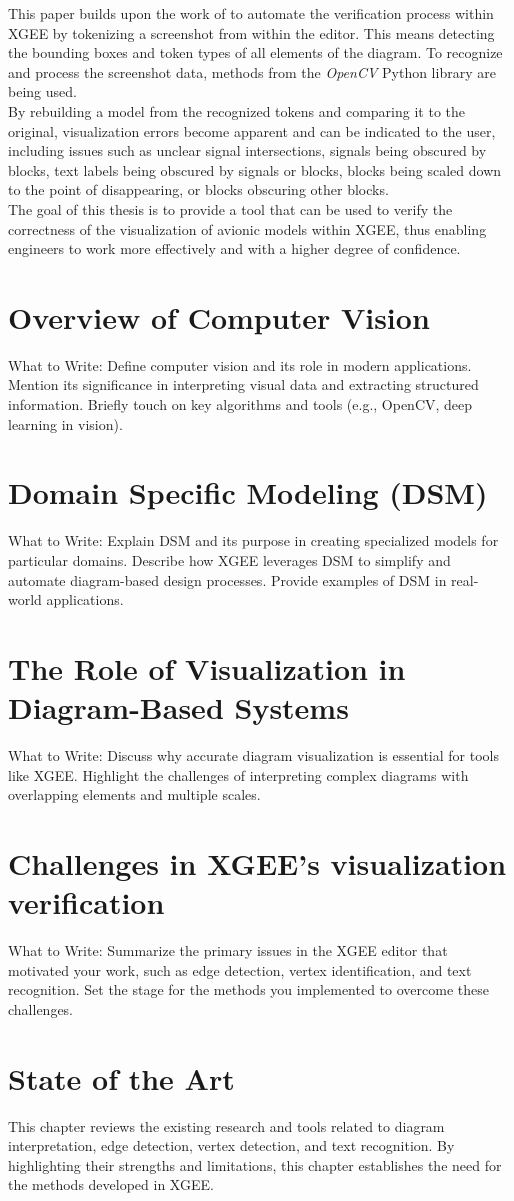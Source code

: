 This paper builds upon the work of \cite{og_paper} to automate the verification process within XGEE by tokenizing a screenshot from within the editor. This means detecting the bounding boxes and token types of all elements of the diagram. To recognize and process the screenshot data, methods from the \textit{OpenCV } Python library are being used.\\
By rebuilding a model from the recognized tokens and comparing it to the original, visualization errors become apparent and can be indicated to the user, including issues such as unclear signal intersections, signals being obscured by blocks, text labels being obscured by signals or blocks, blocks being scaled down to the point of disappearing, or blocks obscuring other blocks.\\
The goal of this thesis is to provide a tool that can be used to verify the correctness of the visualization of avionic models within XGEE, thus enabling engineers to work more effectively and with a higher degree of confidence.


\section{Overview of Computer Vision}
What to Write: Define computer vision and its role in modern applications.
Mention its significance in interpreting visual data and extracting structured information.
Briefly touch on key algorithms and tools (e.g., OpenCV, deep learning in vision).



\section{Domain Specific Modeling (DSM)}
What to Write: Explain DSM and its purpose in creating specialized models for particular domains.
Describe how XGEE leverages DSM to simplify and automate diagram-based design processes.
Provide examples of DSM in real-world applications.
\section{The Role of Visualization in Diagram-Based Systems}
What to Write: Discuss why accurate diagram visualization is essential for tools like XGEE.
Highlight the challenges of interpreting complex diagrams with overlapping elements and multiple scales.
\section{Challenges in XGEE's visualization verification}
What to Write: Summarize the primary issues in the XGEE editor that motivated your work, such as edge detection, vertex identification, and text recognition.
Set the stage for the methods you implemented to overcome these challenges.
\section{State of the Art}



This chapter reviews the existing research and tools related to diagram interpretation, edge detection, vertex detection, and text recognition. By highlighting their strengths and limitations, this chapter establishes the need for the methods developed in XGEE.